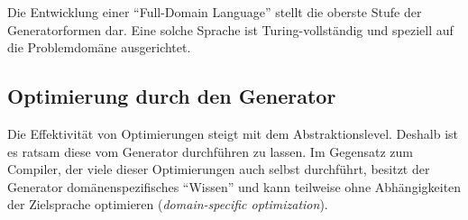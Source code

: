 Die Entwicklung einer \enquote{Full-Domain Language} stellt die oberste Stufe der Generatorformen dar. Eine solche Sprache ist Turing-vollständig und speziell auf die Problemdomäne ausgerichtet.

\subsection{Optimierung durch den Generator}

Die Effektivität von Optimierungen steigt mit dem Abstraktionslevel. Deshalb ist es ratsam diese vom Generator durchführen zu lassen. Im Gegensatz zum Compiler, der viele dieser Optimierungen auch selbst durchführt, besitzt der Generator domänenspezifisches \enquote{Wissen} und kann teilweise ohne Abhängigkeiten der Zielsprache optimieren (\emph{domain-specific optimization}).


